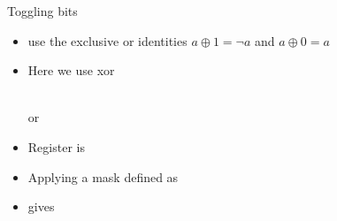 \documentclass[svgnames,x11names]{beamer}
\begin{document}
\begin{frame}[fragile]{Toggling bits}
  \begin{itemize}
  \item use the \alert{exclusive or} identities $ a \oplus 1 = \neg a$ and $a \oplus 0 = a$
  \item Here we use \alert{xor}
    \begin{minipage}{0.8\linewidth}
      \begin{block}{}
      \end{block}
    \end{minipage}\\
  or\\
  \begin{minipage}{0.8\linewidth}
    \begin{block}{}
    \end{block}
  \end{minipage}
  \end{itemize}

  \begin{example}
    \begin{itemize}
    \item 
    Register is
    \item Applying a mask defined as
      \begin{minipage}{0.8\linewidth}
        \begin{block}{}
        \end{block}
      \end{minipage}
    \item gives 
    \end{itemize}
  \end{example}
\end{frame}
\end{document}
